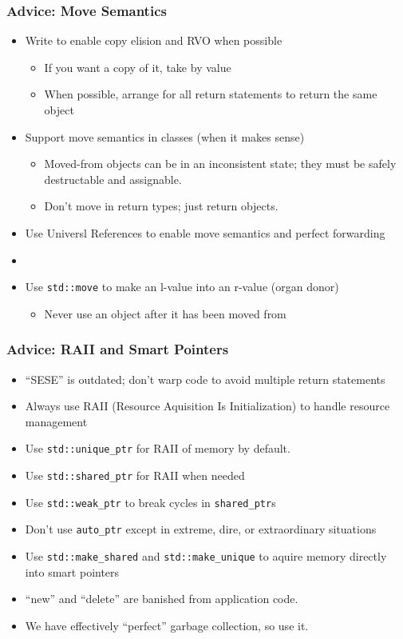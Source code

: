 \begin{frame}[fragile,t]
\frametitle{Advice: Move Semantics}
\begin{itemize}[<+->]
\item Write to enable copy elision and RVO when possible
\begin{itemize}
  \item If you want a copy of it, take by value
  \item When possible, arrange for all return statements to return the
    same object
\end{itemize}

\item Support move semantics in classes (when it makes sense)
\begin{itemize}
  \item Moved-from objects can be in an inconsistent state; they must
    be safely destructable and assignable.
    \item Don't move in return types; just return objects.
\end{itemize}
\item Use Universl References to enable move semantics and perfect
  forwarding
\item {}
\item Use \texttt{std::move} to make an l-value into an r-value (organ donor)
\begin{itemize}
  \item Never use an object after it has been moved from
\end{itemize}
\end{itemize}
\end{frame}

\begin{frame}[fragile,t]
\frametitle{Advice: RAII and Smart Pointers}
\begin{itemize}[<+->]
\item ``SESE'' is outdated; don't warp code to avoid multiple return
  statements
\item Always use RAII (Resource Aquisition Is Initialization) to
  handle resource management
\item Use \texttt{std::unique\_ptr} for RAII of memory by default.
\item Use \texttt{std::shared\_ptr} for RAII when needed
\item Use \texttt{std::weak\_ptr} to break cycles in
  \texttt{shared\_ptr}s
\item Don't use \texttt{auto\_ptr} except in extreme, dire, or
  extraordinary situations
\item Use \texttt{std::make\_shared} and \texttt{std::make\_unique} to
  aquire memory directly into smart pointers
\item ``new'' and ``delete'' are banished from application code.
\item We have effectively ``perfect'' garbage collection, so use it.
\end{itemize}

\end{frame}


